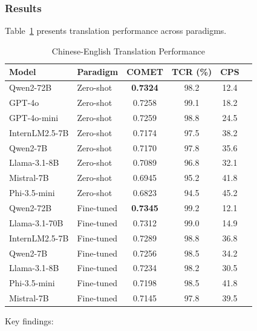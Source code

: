 \subsubsection{Results}

Table~\ref{tab:translation_results} presents translation performance across paradigms.

\begin{table}[htbp]
\centering
\caption{Chinese-English Translation Performance}
\label{tab:translation_results}
\begin{tabular}{@{}llcccc@{}}
\toprule
\textbf{Model} & \textbf{Paradigm} & \textbf{COMET} & \textbf{TCR (\%)} & \textbf{CPS} \\
\midrule
Qwen2-72B & Zero-shot & \textbf{0.7324} & 98.2 & 12.4 \\
GPT-4o & Zero-shot & 0.7258 & 99.1 & 18.2 \\
GPT-4o-mini & Zero-shot & 0.7259 & 98.8 & 24.5 \\
InternLM2.5-7B & Zero-shot & 0.7174 & 97.5 & 38.2 \\
Qwen2-7B & Zero-shot & 0.7170 & 97.8 & 35.6 \\
Llama-3.1-8B & Zero-shot & 0.7089 & 96.8 & 32.1 \\
Mistral-7B & Zero-shot & 0.6945 & 95.2 & 41.8 \\
Phi-3.5-mini & Zero-shot & 0.6823 & 94.5 & 45.2 \\
\midrule
Qwen2-72B & Fine-tuned & \textbf{0.7345} & 99.2 & 12.1 \\
Llama-3.1-70B & Fine-tuned & 0.7312 & 99.0 & 14.9 \\
InternLM2.5-7B & Fine-tuned & 0.7289 & 98.8 & 36.8 \\
Qwen2-7B & Fine-tuned & 0.7256 & 98.5 & 34.2 \\
Llama-3.1-8B & Fine-tuned & 0.7234 & 98.2 & 30.5 \\
Phi-3.5-mini & Fine-tuned & 0.7198 & 98.5 & 41.8 \\
Mistral-7B & Fine-tuned & 0.7145 & 97.8 & 39.5 \\
\bottomrule
\end{tabular}
\end{table}

Key findings:

